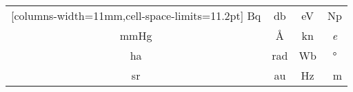 \documentclass{standalone}
\begin{document}
\begin{NiceTabular}{*{4}{c}}[columns-width=11mm,cell-space-limits=11.2pt]
	\unit{\becquerel} & \unit{\decibel} & \unit{\electronvolt} & \unit{\neper} \\
	\unit{\mmHg} & \unit{\angstrom} & \unit{\knot} & \unit{\elementarycharge} \\
	\unit{\hectare} & \unit{\radian} & \unit{\weber} & \unit{\degree} \\
	\unit{\steradian} & \unit{\astronomicalunit} & \unit{\hertz} & \unit{\quetta\metre}
\end{NiceTabular}
\end{document}
